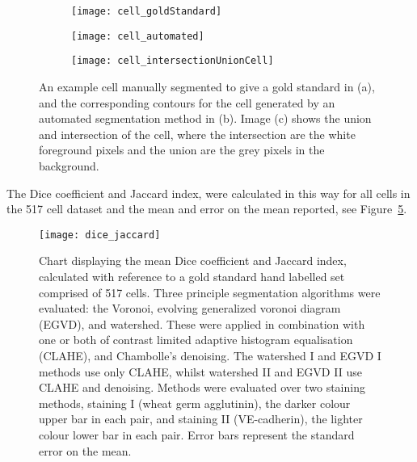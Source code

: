 \begin{figure}[htbp]\centering
	\begin{subfigure}[b]{0.32\linewidth}
		\centering
		\texttt{[image: cell\_goldStandard]}
		\caption{}
		\label{figure:performance_evaluation:cell_gold_standard}
		\vspace{1ex}
	\end{subfigure}
	\begin{subfigure}[b]{0.32\linewidth}
		\centering
		\texttt{[image: cell\_automated]}
		\caption{}
		\label{figure:performance_evaluation:cell_automated}
		\vspace{1ex}
	\end{subfigure}
	\begin{subfigure}[b]{0.32\linewidth}
		\centering
		\texttt{[image: cell\_intersectionUnionCell]}
		\caption{}
		\label{figure:performance_evaluation:cell_intersectionUnionCell}
		\vspace{1ex}
	\end{subfigure}
\caption[Example cell pixel sets gold standard, automated segmentation, and union and intersection]{An example cell manually segmented to give a gold standard in (a), and the corresponding contours for the cell generated by an automated segmentation method in (b). Image (c) shows the union and intersection of the cell, where the intersection are the white foreground pixels and the union are the grey pixels in the background.}
\label{figure:performance_evaluation:cell}
\end{figure}

The Dice coefficient and Jaccard index, were calculated in this way for all cells in the 517 cell dataset and the mean and error on the mean reported, see Figure~\ref{figure:performance_evaluation:dice_jaccard}.
\begin{figure}[htbp!]
	\centering
	\texttt{[image: dice\_jaccard]}
\caption[Cell segmentation overlap ratio measures]{Chart displaying the mean Dice coefficient and Jaccard index, calculated with reference to a gold standard hand labelled set comprised of 517 cells. Three principle segmentation algorithms were evaluated: the Voronoi, evolving generalized voronoi diagram (EGVD), and watershed. These were applied in combination with one or both of contrast limited adaptive histogram equalisation (CLAHE), and Chambolle's denoising. The watershed I and EGVD I methods use only CLAHE, whilst watershed II and EGVD II use CLAHE and denoising. Methods were evaluated over two staining methods, staining I (wheat germ agglutinin), the darker colour upper bar in each pair, and staining II (VE-cadherin), the lighter colour lower bar in each pair. Error bars represent the standard error on the mean.}
\label{figure:performance_evaluation:dice_jaccard}
\end{figure}

